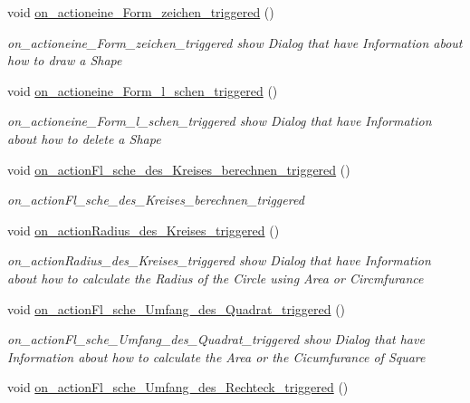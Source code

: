 \begin{DoxyCompactItemize}
void \mbox{\hyperlink{class_main_window_a3576ee46f00f0be0850cdc6c7e495ea6}{on\+\_\+actioneine\+\_\+\+Form\+\_\+zeichen\+\_\+triggered}} ()
\begin{DoxyCompactList}\small\item\em on\+\_\+actioneine\+\_\+\+Form\+\_\+zeichen\+\_\+triggered show Dialog that have Information about how to draw a Shape \end{DoxyCompactList}\item 
void \mbox{\hyperlink{class_main_window_a8f8042443101ec9438d82078a16e8aae}{on\+\_\+actioneine\+\_\+\+Form\+\_\+l\+\_\+schen\+\_\+triggered}} ()
\begin{DoxyCompactList}\small\item\em on\+\_\+actioneine\+\_\+\+Form\+\_\+l\+\_\+schen\+\_\+triggered show Dialog that have Information about how to delete a Shape \end{DoxyCompactList}\item 
void \mbox{\hyperlink{class_main_window_aa1da0f626fe8594775c5a43cd5271d53}{on\+\_\+action\+Fl\+\_\+sche\+\_\+des\+\_\+\+Kreises\+\_\+berechnen\+\_\+triggered}} ()
\begin{DoxyCompactList}\small\item\em on\+\_\+action\+Fl\+\_\+sche\+\_\+des\+\_\+\+Kreises\+\_\+berechnen\+\_\+triggered \end{DoxyCompactList}\item 
void \mbox{\hyperlink{class_main_window_a806656e7a0c374ac6e3d42fdf08edc7b}{on\+\_\+action\+Radius\+\_\+des\+\_\+\+Kreises\+\_\+triggered}} ()
\begin{DoxyCompactList}\small\item\em on\+\_\+action\+Radius\+\_\+des\+\_\+\+Kreises\+\_\+triggered show Dialog that have Information about how to calculate the Radius of the Circle using Area or Circmfurance \end{DoxyCompactList}\item 
void \mbox{\hyperlink{class_main_window_aae9811274a2783bdd8c6a4cf76a8f474}{on\+\_\+action\+Fl\+\_\+sche\+\_\+\+Umfang\+\_\+des\+\_\+\+Quadrat\+\_\+triggered}} ()
\begin{DoxyCompactList}\small\item\em on\+\_\+action\+Fl\+\_\+sche\+\_\+\+Umfang\+\_\+des\+\_\+\+Quadrat\+\_\+triggered show Dialog that have Information about how to calculate the Area or the Cicumfurance of Square \end{DoxyCompactList}\item 
void \mbox{\hyperlink{class_main_window_a940ec6db57cf4a86fd6ba85ed258d024}{on\+\_\+action\+Fl\+\_\+sche\+\_\+\+Umfang\+\_\+des\+\_\+\+Rechteck\+\_\+triggered}} ()

\end{DoxyCompactItemize}
